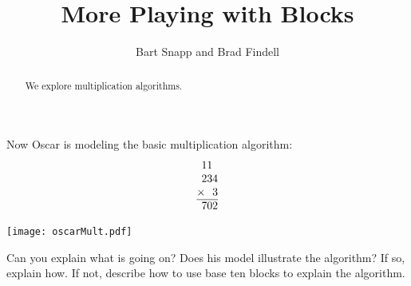 \documentclass[nooutcomes]{ximera}
\title{More Playing with Blocks}
\author{Bart Snapp and Brad Findell}
\begin{document}
\begin{abstract}
  We explore multiplication algorithms.
\end{abstract}
\maketitle

\label{A:B2} 


\begin{problem}
Now Oscar is modeling the basic multiplication algorithm:
\[
\normalfont
\begin{tabular}{@{}r@{}}
11\phantom{0}\\
234\\
$\times$~~3\\ \hline
702
\end{tabular}
\]
\begin{image}
\texttt{[image: oscarMult.pdf]}
\end{image}
Can you explain what is going on?  Does his model illustrate the algorithm?  If so, explain how.  If not, describe how to use base ten blocks to explain the algorithm.  
\end{problem}
\end{document}
